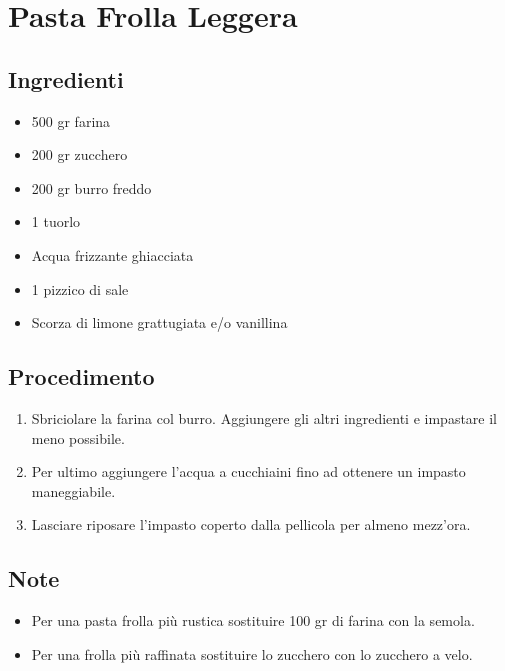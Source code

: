 \section{Pasta Frolla Leggera}
\subsection{Ingredienti}
\begin{itemize}
\item 500 gr farina  
\item 200 gr zucchero  
\item 200 gr burro freddo  
\item 1 tuorlo  
\item Acqua frizzante ghiacciata  
\item 1 pizzico di sale  
\item Scorza di limone grattugiata e/o vanillina
\end{itemize}
\subsection{Procedimento}
\begin{enumerate}
\item  Sbriciolare la farina col burro. Aggiungere gli altri ingredienti e impastare il meno possibile.  
\item  Per ultimo aggiungere l'acqua a cucchiaini fino ad ottenere un impasto maneggiabile.   
\item  Lasciare riposare l'impasto coperto dalla pellicola per almeno mezz'ora.
\end{enumerate}
\subsection{Note}
\begin{itemize}
\item Per una pasta frolla più rustica sostituire 100 gr di farina con la semola.  
\item Per una frolla più raffinata sostituire lo zucchero con lo zucchero a velo.
\end{itemize}
